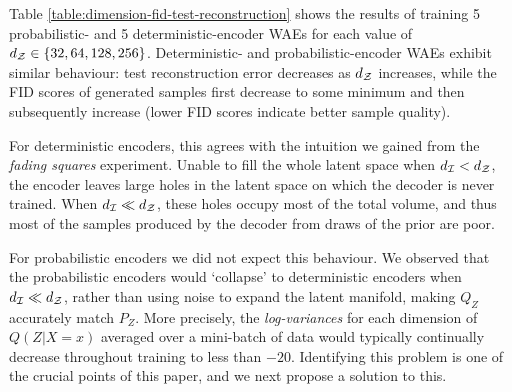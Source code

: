 
Table \ref{table:dimension-fid-test-reconstruction} shows the results of training 5 probabilistic- and 5 deterministic-encoder WAEs for each value of $d_{\mathcal{Z}} \in \{32, 64, 128, 256\}$. 
Deterministic- and probabilistic-encoder WAEs exhibit similar behaviour: test reconstruction error decreases as $d_{\mathcal{Z}}$ increases, while the FID scores \citep{heusel2017gans} of generated samples first decrease to some minimum and then subsequently increase (lower FID scores indicate better sample quality).


For deterministic encoders, this agrees with the intuition we gained from the \emph{fading squares} experiment. Unable to fill the whole latent space when $d_{\mathcal{I}} < d_{\mathcal{Z}}$, the encoder leaves large holes in the latent space on which the decoder is never trained. When $d_{\mathcal{I}} \ll d_{\mathcal{Z}}$, these holes occupy most of the total volume, and thus most of the samples produced by the decoder from draws of the prior are poor.


For probabilistic encoders we did not expect this behaviour. We observed that the probabilistic encoders would `collapse' to deterministic encoders when $d_{\mathcal{I}}\ll d_{\mathcal{Z}}$, rather than using noise to expand the latent manifold, making $Q_Z$ accurately match $P_Z$. More precisely, the \emph{log-variances} for each dimension of $Q(Z|X=x)$ averaged over a mini-batch of data would typically continually decrease throughout training to less than $-20$.
Identifying this problem is one of the crucial points of this paper, and we next propose a solution to this.

